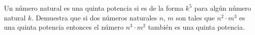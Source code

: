 Un número natural es una quinta potencia si es de la forma $k^5$ para algún número natural $k$. Demuestra que si dos números naturales $n$, $m$ son tales que $n^2\cdot m^3$ es una quinta potencia entonces el número $n^3\cdot m^2$ también es una quinta potencia.